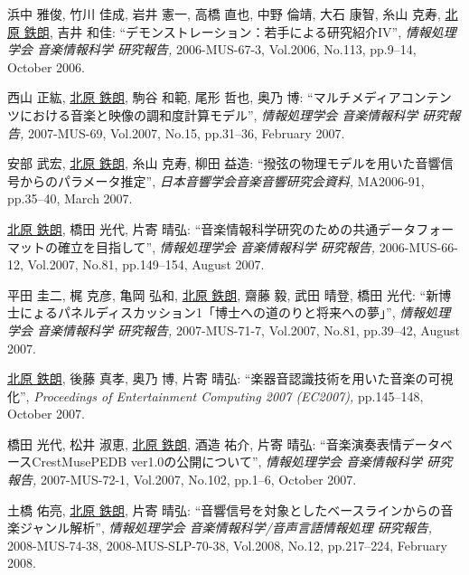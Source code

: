 \begin{Enumerate}
\item 
浜中 雅俊, 
竹川 佳成, 
岩井 憲一, 
高橋 直也, 
 中野 倫靖, 
大石 康智, 
糸山 克寿, 
\underline{北原 鉄朗}, 
吉井 和佳: 
    ``デモンストレーション：若手による研究紹介IV'', 
    {\it 情報処理学会 音楽情報科学 研究報告,} 2006-MUS-67-3, Vol.2006, No.113, pp.9--14, October 2006. 

\item 
西山 正紘, 
\underline{北原 鉄朗}, 
駒谷
      和範, 
尾形 哲也, 
奥乃 博: 
    ``マルチメディアコンテンツにおける音楽と映像の調和度計算モデル'', 
    {\it 情報処理学会 音楽情報科学 研究報告,} 2007-MUS-69, Vol.2007, No.15, pp.31--36, February 2007. 

\item 
安部 武宏, 
\underline{北原 鉄朗}, 
糸山 克寿, 
柳田 益造: 
    ``撥弦の物理モデルを用いた音響信号からのパラメータ推定'', 
    {\it 日本音響学会音楽音響研究会資料,
    } MA2006-91, pp.35--40, March 2007. 

\item 
\underline{北原 鉄朗}, 
橋田 光代, 
片寄 晴弘: 
    ``音楽情報科学研究のための共通データフォーマットの確立を目指して'', 
    {\it 情報処理学会 音楽情報科学 研究報告,} 2006-MUS-66-12, Vol.2007, No.81, pp.149--154, August 2007. 

\item 
平田 圭二, 
梶 克彦, 
亀岡 弘和, 
\underline{北原 鉄朗}, 
齋藤 毅, 
武田 晴登, 
橋田 光代: 
    ``新博士にょるパネルディスカッション1「博士への道のりと将来への夢」'', 
    {\it 情報処理学会 音楽情報科学 研究報告,} 2007-MUS-71-7, Vol.2007, No.81, pp.39--42, August 2007. 

\item 
\underline{北原 鉄朗}, 
後藤
      真孝, 
奥乃 博, 
片寄 晴弘: 
    ``楽器音認識技術を用いた音楽の可視化'', 
    {\it Proceedings of
      Entertainment Computing 2007
          (EC2007),
        } pp.145--148, October 2007. 

\item 
橋田 光代, 
松井 淑恵, 
\underline{北原 鉄朗}, 
酒造 祐介, 
片寄 晴弘: 
    ``音楽演奏表情データベースCrestMusePEDB ver1.0の公開について'', 
    {\it 情報処理学会 音楽情報科学 研究報告,} 2007-MUS-72-1, Vol.2007, No.102, pp.1--6, October 2007. 

\item 
土橋 佑亮, 
\underline{北原 鉄朗}, 
片寄 晴弘: 
    ``音響信号を対象としたベースラインからの音楽ジャンル解析'', 
    {\it 情報処理学会 音楽情報科学/音声言語情報処理 研究報告,
    } 2008-MUS-74-38, 2008-MUS-SLP-70-38, Vol.2008, No.12, pp.217--224, February 2008. 


\end{Enumerate}
